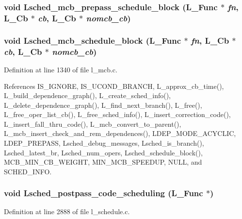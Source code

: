 \subsubsection{\setlength{\rightskip}{0pt plus 5cm}void Lsched\_\-mcb\_\-prepass\_\-schedule\_\-block (L\_\-Func $\ast$ {\em fn}, L\_\-Cb $\ast$ {\em cb}, L\_\-Cb $\ast$ {\em nomcb\_\-cb})}\label{l__schedule_8h_f6777b96ea9652dc942976a6cd50acd9}


\subsubsection{\setlength{\rightskip}{0pt plus 5cm}void Lsched\_\-mcb\_\-schedule\_\-block (L\_\-Func $\ast$ {\em fn}, L\_\-Cb $\ast$ {\em cb}, L\_\-Cb $\ast$ {\em nomcb\_\-cb})}\label{l__schedule_8h_87c4a42bf87228adc317fe08e2aa57d1}




Definition at line 1340 of file l\_\-mcb.c.

References IS\_\-IGNORE, IS\_\-UCOND\_\-BRANCH, L\_\-approx\_\-cb\_\-time(), L\_\-build\_\-dependence\_\-graph(), L\_\-create\_\-sched\_\-info(), L\_\-delete\_\-dependence\_\-graph(), L\_\-find\_\-next\_\-branch(), L\_\-free(), L\_\-free\_\-oper\_\-list\_\-cb(), L\_\-free\_\-sched\_\-info(), L\_\-insert\_\-correction\_\-code(), L\_\-insert\_\-fall\_\-thru\_\-code(), L\_\-mcb\_\-convert\_\-to\_\-parent(), L\_\-mcb\_\-insert\_\-check\_\-and\_\-rem\_\-dependences(), LDEP\_\-MODE\_\-ACYCLIC, LDEP\_\-PREPASS, Lsched\_\-debug\_\-messages, Lsched\_\-is\_\-branch(), Lsched\_\-latest\_\-br, Lsched\_\-num\_\-opers, Lsched\_\-schedule\_\-block(), MCB\_\-MIN\_\-CB\_\-WEIGHT, MIN\_\-MCB\_\-SPEEDUP, NULL, and SCHED\_\-INFO.
\subsubsection{\setlength{\rightskip}{0pt plus 5cm}void Lsched\_\-postpass\_\-code\_\-scheduling (L\_\-Func $\ast$)}\label{l__schedule_8h_0c1b6380eecbd9730e44bfe81b1621bc}




Definition at line 2888 of file l\_\-schedule.c.

